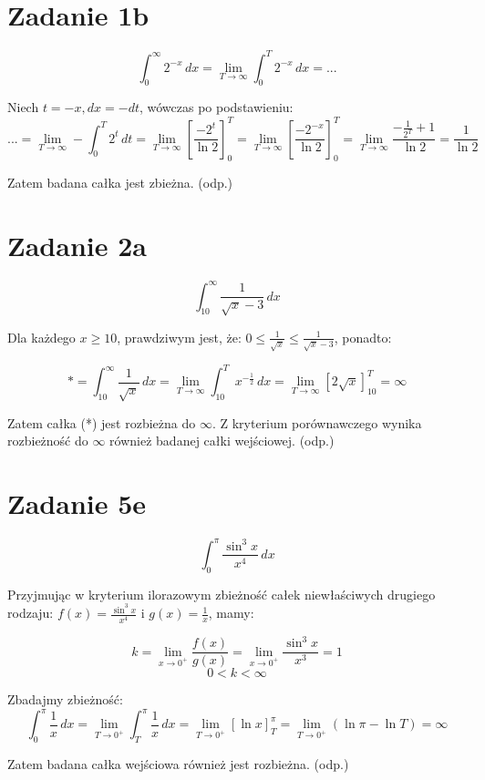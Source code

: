 \documentclass{article}
\begin{document}
\section*{Zadanie 1b}

$$\int_{0}^{\infty} 2^{-x} \,dx = \lim_{T\to \infty} \int_{0}^{T} 2^{-x} \,dx = ...$$

Niech $t = -x, dx = -dt$, wówczas po podstawieniu:
$$ ... = \lim_{T\to \infty} - \int_{0}^{T} 2^{t} \,dt = \lim_{T\to \infty} [\frac{-2^t}{\ln2}]_{0}^{T} = \lim_{T\to \infty} [\frac{-2^{-x}}{\ln2}]_{0}^{T} = \lim_{T\to \infty} \frac{-\frac{1}{2^T}+1}{\ln2} = \frac{1}{\ln2}$$

Zatem badana całka jest zbieżna. (odp.)

\section*{Zadanie 2a}

$$\int_{10}^{\infty} \frac{1}{\sqrt{x}-3} \,dx$$

Dla każdego $x \geq 10$, prawdziwym jest, że: $0 \leq \frac{1}{\sqrt{x}} \leq \frac{1}{\sqrt{x}-3}$, ponadto:

$$* = \int_{10}^{\infty} \frac{1}{\sqrt{x}} \,dx = \lim_{T\to \infty} \int_{10}^{T} x^{-\frac{1}{2}} \,dx = \lim_{T\to \infty} [2\sqrt{x}]_{10}^{T} = \infty$$

Zatem całka (*) jest rozbieżna do $\infty$. Z kryterium porównawczego wynika rozbieżność do $\infty$ również badanej całki wejściowej. (odp.)

\section*{Zadanie 5e}

$$\int_{0}^{\pi} \frac{\sin^3{x}}{x^4} \,dx$$

Przyjmując w kryterium ilorazowym zbieżność całek niewłaściwych drugiego rodzaju: $f(x) = \frac{\sin^3{x}}{x^4}$ i $g(x) = \frac{1}{x}$, mamy:

$$k = \lim_{x \to 0^{+}} \frac{f(x)}{g(x)} = \lim_{x \to 0^{+}} \frac{\sin^3{x}}{x^3} = 1$$
$$0 < k < \infty$$

Zbadajmy zbieżność:
$$\int_{0}^{\pi}\frac{1}{x} \,dx = \lim_{T\to 0^{+}} \int_{T}^{\pi} \frac{1}{x} \,dx = \lim_{T\to 0^{+}} [\ln{x}]_{T}^{\pi} = \lim_{T\to 0^{+}} (\ln{\pi}-\ln{T}) = \infty$$

Zatem badana całka wejściowa również jest rozbieżna. (odp.)
\end{document}
